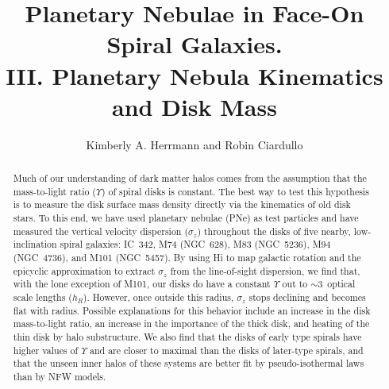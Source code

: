 \documentclass[12pt,preprint]{emulateapj}
\begin{document}
\title{Planetary Nebulae in Face-On Spiral Galaxies. \\ III. Planetary Nebula Kinematics and Disk Mass}

\author{Kimberly A. Herrmann and Robin Ciardullo}




\begin{abstract}
Much of our understanding of dark matter halos comes from the assumption that the mass-to-light ratio ($\Upsilon$) of spiral disks is constant.  The best way to test this hypothesis is to measure the disk surface mass density directly via the kinematics of old disk stars.  To this end, we have used planetary nebulae (PNe) as test particles and have measured the vertical velocity dispersion ($\sigma_z$) throughout the disks of five nearby, low-inclination spiral galaxies:  IC~342, M74 (NGC~628), M83 (NGC~5236), M94 (NGC~4736), and M101 (NGC~5457).  By using H{\sc i} to map galactic rotation and the epicyclic approximation to extract $\sigma_z$ from the line-of-sight dispersion, we find that, with the lone exception of M101, our disks do have a constant $\Upsilon$ out to $\sim$3~optical scale lengths ($h_R$).  However, once outside this radius, $\sigma_z$ stops declining and becomes flat with radius.   Possible explanations for this behavior include an increase in the disk mass-to-light ratio, an increase in the importance of the thick disk, and heating of the thin disk by halo substructure.   We also find that the disks of early type spirals have higher values of $\Upsilon$ and are closer to maximal than the disks of later-type spirals, and that the unseen inner halos of these systems are better fit by pseudo-isothermal laws than by NFW models.

\end{abstract}
\end{document}
